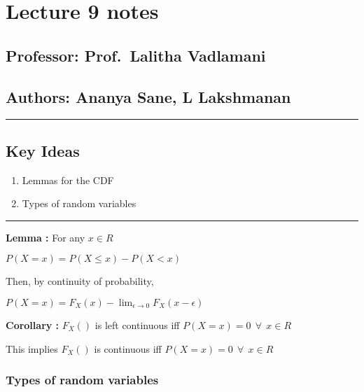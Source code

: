 \hypertarget{lecture-9-notes}{%
\section{Lecture 9 notes}\label{lecture-9-notes}}

\hypertarget{professor-prof.-lalitha-vadlamani}{%
\subsection{Professor: Prof.~Lalitha
Vadlamani}\label{professor-prof.-lalitha-vadlamani}}

\hypertarget{authors-ananya-sane-l-lakshmanan}{%
\subsection{Authors: Ananya Sane, L
Lakshmanan}\label{authors-ananya-sane-l-lakshmanan}}

\begin{center}\rule{0.5\linewidth}{0.5pt}\end{center}

\hypertarget{key-ideas}{%
\subsection{Key Ideas}\label{key-ideas}}

\begin{enumerate}
\def\labelenumi{\arabic{enumi}.}
\item
  Lemmas for the CDF
\item
  Types of random variables
\end{enumerate}

\begin{center}\rule{0.5\linewidth}{0.5pt}\end{center}

\textbf{Lemma :} For any \(x \in R\)

\(P(X = x) = P(X \leq x) - P(X < x)\)

Then, by continuity of probability,

\(P(X = x) = F_X(x) - \displaystyle\lim_{\epsilon \to 0} F_X(x -\epsilon)\)

\textbf{Corollary :} \(F_X()\) is left continuous iff
\(P(X = x) = 0 \ \ \forall \ \ x \in R\)

This implies \(F_X()\) is continuous iff
\(P(X = x) = 0 \ \ \forall \ \ x \in R\)

\hypertarget{types-of-random-variables}{%
\subsubsection{Types of random
variables}\label{types-of-random-variables}}

